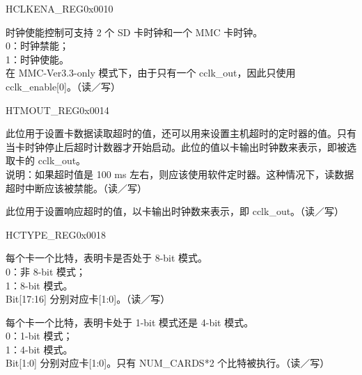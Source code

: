\begin{register}{H}{CLKENA\_REG}{0x0010}\label{regdesc:CLKENAREG}
%
%
\regnewline%
\begin{regdesc}\begin{reglist}
\item [CCLK\_ENABEL]时钟使能控制可支持 2 个 SD 卡时钟和一个 MMC 卡时钟。\\
0：时钟禁能；\\
1：时钟使能。\\
在 MMC-Ver3.3-only 模式下，由于只有一个 cclk\_out，因此只使用 cclk\_enable[0]。（读／写）
\end{reglist}\end{regdesc}
\end{register}


\begin{register}{H}{TMOUT\_REG}{0x0014}\label{regdesc:TMOUTREG}
%
%
\regnewline%
\begin{regdesc}\begin{reglist}
\item [DATA\_TIMEOUT]此位用于设置卡数据读取超时的值，还可以用来设置主机超时的定时器的值。只有当卡时钟停止后超时计数器才开始启动。此位的值以卡输出时钟数来表示，即被选取卡的 cclk\_out。\\
说明：如果超时值是 100 ms 左右，则应该使用软件定时器。这种情况下，读数据超时中断应该被禁能。（读／写）
\item [RESPONSE\_TIMEOUT]此位用于设置响应超时的值，以卡输出时钟数来表示，即 cclk\_out。（读／写）
\end{reglist}\end{regdesc}
\end{register}


\begin{register}{H}{CTYPE\_REG}{0x0018}\label{regdesc:CTYPEREG}
%
%
%
%
\regnewline%
\begin{regdesc}\begin{reglist}
\item [CARD\_WIDTH8]每个卡一个比特，表明卡是否处于 8-bit 模式。\\
0：非 8-bit 模式；\\
1：8-bit 模式。\\
Bit[17:16] 分别对应卡[1:0]。（读／写）
\item [CARD\_WIDTH4]每个卡一个比特，表明卡处于 1-bit 模式还是 4-bit 模式。\\
0：1-bit 模式；\\
1：4-bit 模式。\\
Bit[1:0] 分别对应卡[1:0]。只有 NUM\_CARDS*2 个比特被执行。（读／写）
\end{reglist}\end{regdesc}
\end{register}


